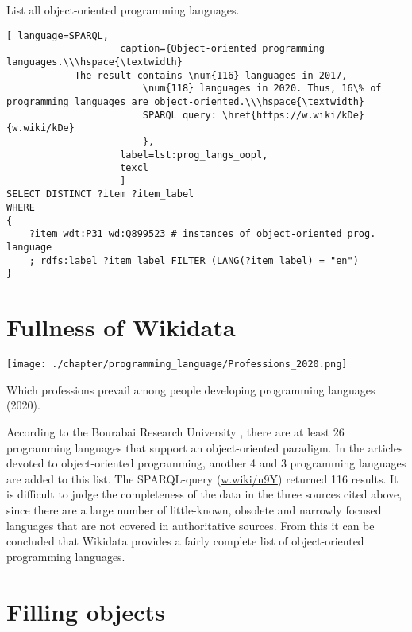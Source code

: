 List all object-oriented programming languages.

\begin{lstlisting}[ language=SPARQL, 
                    caption={Object-oriented programming languages.\\\hspace{\textwidth}
			The result contains \num{116} languages in 2017, 
                        \num{118} languages in 2020. Thus, 16\% of programming languages are object-oriented.\\\hspace{\textwidth}
                        SPARQL query: \href{https://w.wiki/kDe}{w.wiki/kDe}
                        },
                    label=lst:prog_langs_oopl,
                    texcl 
                    ]
SELECT DISTINCT ?item ?item_label
WHERE
{
    ?item wdt:P31 wd:Q899523 # instances of object-oriented prog. language
    ; rdfs:label ?item_label FILTER (LANG(?item_label) = "en") 
}
\end{lstlisting}%

\section{Fullness of Wikidata}

\begin{marginfigure}[5pt]
	\texttt{[image: ./chapter/programming\_language/Professions\_2020.png]}
	\caption{Which professions prevail among people developing programming languages (2020).}
	\label{fig:Professions_2020}
\end{marginfigure}
According to the Bourabai Research University \cite{oo_langs_bourabai}, there are at least 26 programming languages that support an object-oriented paradigm. In the articles devoted to object-oriented programming, another 4 \cite{oo_langs_science_wikia} and 3 \cite{oo_langs_garshin} programming languages are added to this list. The SPARQL-query (\href{https://w.wiki/n9Y}{w.wiki/n9Y}) returned 116 results. It is difficult to judge the completeness of the data in the three sources cited above, since there are a large number of little-known, obsolete and narrowly focused languages that are not covered in authoritative sources. From this it can be concluded that Wikidata provides a fairly complete list of object-oriented programming languages.

\section{Filling objects}

